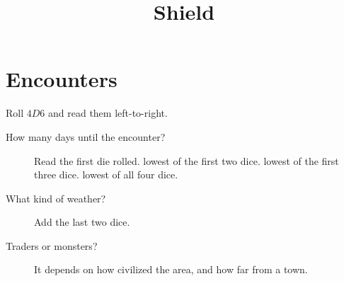 \documentclass[a4paper,openany]{book}
\title{\Glsentrytext{gm} Shield}
\begin{document}


\cleardoublepage

\section{Encounters}

\begin{multicols}{2}

\noindent
Roll $4D6$ and read them left-to-right.

\begin{description}
  \item[How many days until the encounter?]
  Read the
  \ifcase\value{temperature}%
    first die rolled. 
  \or%
    lowest of the first two dice.
  \or%
    lowest of the first three dice.
  \or%
    lowest of all four dice.
  \fi
  \item[What kind of weather?]
  Add the last two dice.
  \item[Traders or monsters?]
  It depends on how civilized the area, and how far from a town.
  \setcounter{encnum}{1}
  \begin{description}
  \end{description}
\end{description}

\end{multicols}

\bigLine
\end{document}
